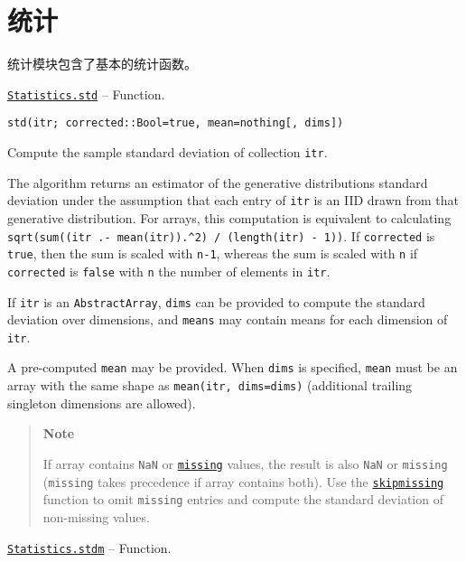 \hypertarget{3919294208060022612}{}


\chapter{统计}





统计模块包含了基本的统计函数。


\hypertarget{1955374586742019663}{}
\hyperlink{1955374586742019663}{\texttt{Statistics.std}}  -- {Function.}

\begin{adjustwidth}{2em}{0pt}


\begin{verbatim}
std(itr; corrected::Bool=true, mean=nothing[, dims])
\end{verbatim}

Compute the sample standard deviation of collection \texttt{itr}.

The algorithm returns an estimator of the generative distribution{\textquotesingle}s standard deviation under the assumption that each entry of \texttt{itr} is an IID drawn from that generative distribution. For arrays, this computation is equivalent to calculating \texttt{sqrt(sum((itr .- mean(itr)).{\textasciicircum}2) / (length(itr) - 1))}. If \texttt{corrected} is \texttt{true}, then the sum is scaled with \texttt{n-1}, whereas the sum is scaled with \texttt{n} if \texttt{corrected} is \texttt{false} with \texttt{n} the number of elements in \texttt{itr}.

If \texttt{itr} is an \texttt{AbstractArray}, \texttt{dims} can be provided to compute the standard deviation over dimensions, and \texttt{means} may contain means for each dimension of \texttt{itr}.

A pre-computed \texttt{mean} may be provided. When \texttt{dims} is specified, \texttt{mean} must be an array with the same shape as \texttt{mean(itr, dims=dims)} (additional trailing singleton dimensions are allowed).

\begin{quote}
\textbf{Note}

If array contains \texttt{NaN} or \hyperlink{14596725676261444434}{\texttt{missing}} values, the result is also \texttt{NaN} or \texttt{missing} (\texttt{missing} takes precedence if array contains both). Use the \hyperlink{2012470681884771400}{\texttt{skipmissing}} function to omit \texttt{missing} entries and compute the standard deviation of non-missing values.

\end{quote}


\end{adjustwidth}
\hypertarget{11197607150486088950}{}
\hyperlink{11197607150486088950}{\texttt{Statistics.stdm}}  -- {Function.}


